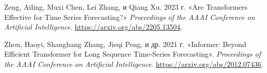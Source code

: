 \begin{CSLReferences}{1}{1}
Zeng, Ailing, Muxi Chen, Lei Zhang, и Qiang Xu. 2023 г. {«Are
Transformers Effective for Time Series Forecasting?»} \emph{Proceedings
of the AAAI Conference on Artificial Intelligence}.
\url{https://arxiv.org/abs/2205.13504}.

Zhou, Haoyi, Shanghang Zhang, Jieqi Peng, и др. 2021 г. {«Informer:
Beyond Efficient Transformer for Long Sequence Time-Series
Forecasting»}. \emph{Proceedings of the AAAI Conference on Artificial
Intelligence}. \url{https://arxiv.org/abs/2012.07436}.

\end{CSLReferences}
